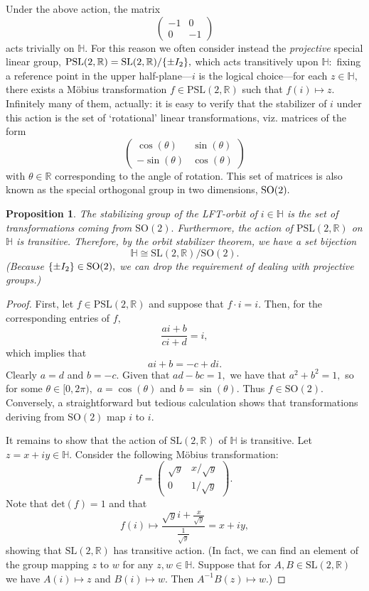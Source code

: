 \documentclass[12pt, letterpaper, oneside]{book}
\newcommand{\R}{\mathbb{R}}
\DeclarePairedDelimiter{\set}{\lbrace}{\rbrace}
\theoremstyle{plain}
\newtheorem{tion}{Proposition}
\theoremstyle{definition}
\theoremstyle{remark}
\begin{document}
Under the above action, the matrix 
\[
\begin{pmatrix} -1 & 0 \\ 0 & -1 \end{pmatrix}
\]
acts trivially on $\mathbb{H}.$ For this reason we often consider instead the \textit{projective} special linear group, $\mbox{PSL}(2, \R) = \mbox{SL}(2,\R) / \set{\pm I_2},$ which acts transitively upon $\mathbb{H}:$ fixing a reference point in the upper half-plane---$i$ is the logical choice---for each $z \in \mathbb{H},$ there exists a M\"obius transformation $f \in \mbox{PSL}(2,\R)$ such that $f(i) \mapsto z.$ Infinitely many of them, actually: it is easy to verify that the stabilizer of $i$ under this action is the set of `rotational' linear transformations, viz. matrices of the form
\[
\begin{pmatrix} \cos(\theta) & \sin(\theta) \\ -\sin(\theta) & \cos(\theta) \end{pmatrix}
\]
with $\theta \in \R$ corresponding to the angle of rotation. This set of matrices is also known as the special orthogonal group in two dimensions, $\mbox{\mbox{SO}}(2).$ 

\begin{tion}
The stabilizing group of the LFT-orbit of $i \in \mathbb{H}$ is the set of transformations coming from $\mbox{SO}(2).$ Furthermore, the action of $\mbox{PSL}(2,\R)$  on $\mathbb{H}$ is transitive. Therefore, by the orbit stabilizer theorem, we have a set bijection 
\[
\mathbb{H} \cong \mbox{SL}(2, \R) / \mbox{SO}(2).
\]
(Because $\set{\pm I_2} \in \mbox{SO}(2),$ we can drop the requirement of dealing with projective groups.)
\end{tion}

\begin{proof}
First, let $f \in \mbox{PSL}(2,\R)$ and suppose that $f \cdot i = i.$ Then, for the corresponding entries of $f,$
\[
\frac{ai + b}{ci+d} = i,
\]
which implies that
\[
ai + b = -c + di.
\]
Clearly $a = d$ and $b = -c.$ Given that $ad - bc = 1,$ we have that $a^2 + b^2 = 1,$ so for some $\theta \in [0, 2\pi),$ $a = \cos(\theta)$ and $b = \sin(\theta).$ Thus $f \in \mbox{SO}(2).$ Conversely,  a straightforward but tedious calculation shows that transformations deriving from $\mbox{SO}(2)$ map $i$ to $i.$

It remains to show that the action of $\mbox{SL}(2,\R)$ of $\mathbb{H}$ is transitive. Let $z = x + iy \in \mathbb{H}.$ Consider the following M\"obius transformation:
\[
f = \begin{pmatrix} \sqrt{y} & x / \sqrt{y} \\ 0 & 1/\sqrt{y} \end{pmatrix}.
\]
Note that $\mbox{det}(f) = 1$ and that
\[
f(i) \mapsto \frac{\sqrt{y}i + \frac{x}{\sqrt{y}}}{\frac{1}{\sqrt{y}}} = x + iy,
\]
showing that $\mbox{SL}(2,\R)$ has transitive action. (In fact, we can find an element of the group mapping $z$ to $w$ for any $z,w \in \mathbb{H}.$ Suppose that for $A,B \in \mbox{SL}(2,\R)$ we have $A(i) \mapsto z$ and $B(i) \mapsto w.$ Then $A^{-1}B(z) \mapsto w.$)
\end{proof}
\end{document}
